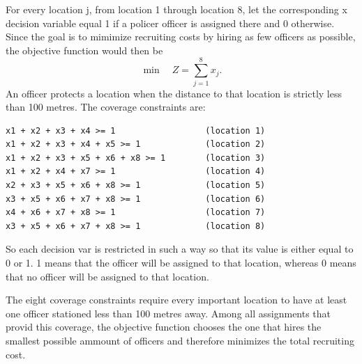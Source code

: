 \documentclass[12pt,fleqn]{article}
\begin{document}
For every location j, from location 1 through location 8, let the corresponding
x decision variable equal 1 if a policer officer is assigned there and 0
otherwise. Since the goal is to mimimize recruiting costs by hiring as few
officers as possible, the objective function would then be
\[
\min \quad Z=\sum_{j=1}^{8}x_j.
\]
An officer protects a location when the distance to that location is
strictly less than 100 metres. The coverage constraints are:
\begin{verbatim}
x1 + x2 + x3 + x4 >= 1                  (location 1)
x1 + x2 + x3 + x4 + x5 >= 1             (location 2)
x1 + x2 + x3 + x5 + x6 + x8 >= 1        (location 3)
x1 + x2 + x4 + x7 >= 1                  (location 4)
x2 + x3 + x5 + x6 + x8 >= 1             (location 5)
x3 + x5 + x6 + x7 + x8 >= 1             (location 6)
x4 + x6 + x7 + x8 >= 1                  (location 7)
x3 + x5 + x6 + x7 + x8 >= 1             (location 8)
\end{verbatim}

So each decision var is restricted in such a way so that its value is either equal
to 0 or 1. 1 means that the officer will be assigned to that location, whereas 0
means that no officer will be assigned to that location. 

The eight coverage constraints require every important location to have at
least one officer stationed less than 100 metres away. Among all assignments
that provid this coverage, the objective function chooses the one that hires
the smallest possible ammount of officers and therefore minimizes the total
recruiting cost.
\end{document}
